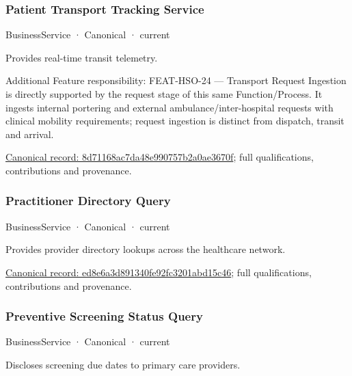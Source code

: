\subsubsection{Patient Transport Tracking Service}

\label{element:8d71168ac7da48e990757b2a0ae3670f}
{\small BusinessService · Canonical · current}\par

Provides real-time transit telemetry.



Additional Feature responsibility: FEAT-HSO-24 — Transport Request Ingestion is directly supported by the request stage of this same Function/Process. It ingests internal portering and external ambulance/inter-hospital requests with clinical mobility requirements; request ingestion is distinct from dispatch, transit and arrival.


{\footnotesize \href{../../../../continuum/business/business-service/8d71168ac7da48e990757b2a0ae3670f.md}{Canonical record: 8d71168ac7da48e990757b2a0ae3670f}; full qualifications, contributions and provenance.}\par
\subsubsection{Practitioner Directory Query}

\label{element:ed8e6a3d891340fe92fc3201abd15c46}
{\small BusinessService · Canonical · current}\par

Provides provider directory lookups across the healthcare network.


{\footnotesize \href{../../../../continuum/business/business-service/ed8e6a3d891340fe92fc3201abd15c46.md}{Canonical record: ed8e6a3d891340fe92fc3201abd15c46}; full qualifications, contributions and provenance.}\par
\subsubsection{Preventive Screening Status Query}

\label{element:bc679a6f23de44b79a452fb5ef10c5ee}
{\small BusinessService · Canonical · current}\par

Discloses screening due dates to primary care providers.



